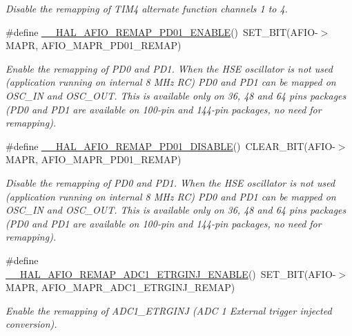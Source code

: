 \begin{DoxyCompactItemize}
\begin{DoxyCompactList}\small\item\em Disable the remapping of T\+I\+M4 alternate function channels 1 to 4. \end{DoxyCompactList}\item 
\#define \hyperlink{group___g_p_i_o_ex___a_f_i_o___a_f___r_e_m_a_p_p_i_n_g_ga556c166ea45a713875b6a179b101fa14}{\+\_\+\+\_\+\+H\+A\+L\+\_\+\+A\+F\+I\+O\+\_\+\+R\+E\+M\+A\+P\+\_\+\+P\+D01\+\_\+\+E\+N\+A\+B\+LE}()~S\+E\+T\+\_\+\+B\+IT(A\+F\+IO-\/$>$M\+A\+PR, A\+F\+I\+O\+\_\+\+M\+A\+P\+R\+\_\+\+P\+D01\+\_\+\+R\+E\+M\+AP)
\begin{DoxyCompactList}\small\item\em Enable the remapping of P\+D0 and P\+D1. When the H\+SE oscillator is not used (application running on internal 8 M\+Hz RC) P\+D0 and P\+D1 can be mapped on O\+S\+C\+\_\+\+IN and O\+S\+C\+\_\+\+O\+UT. This is available only on 36, 48 and 64 pins packages (P\+D0 and P\+D1 are available on 100-\/pin and 144-\/pin packages, no need for remapping). \end{DoxyCompactList}\item 
\#define \hyperlink{group___g_p_i_o_ex___a_f_i_o___a_f___r_e_m_a_p_p_i_n_g_gab56e83c0681be2899477e8d9376100ab}{\+\_\+\+\_\+\+H\+A\+L\+\_\+\+A\+F\+I\+O\+\_\+\+R\+E\+M\+A\+P\+\_\+\+P\+D01\+\_\+\+D\+I\+S\+A\+B\+LE}()~C\+L\+E\+A\+R\+\_\+\+B\+IT(A\+F\+IO-\/$>$M\+A\+PR, A\+F\+I\+O\+\_\+\+M\+A\+P\+R\+\_\+\+P\+D01\+\_\+\+R\+E\+M\+AP)
\begin{DoxyCompactList}\small\item\em Disable the remapping of P\+D0 and P\+D1. When the H\+SE oscillator is not used (application running on internal 8 M\+Hz RC) P\+D0 and P\+D1 can be mapped on O\+S\+C\+\_\+\+IN and O\+S\+C\+\_\+\+O\+UT. This is available only on 36, 48 and 64 pins packages (P\+D0 and P\+D1 are available on 100-\/pin and 144-\/pin packages, no need for remapping). \end{DoxyCompactList}\item 
\#define \hyperlink{group___g_p_i_o_ex___a_f_i_o___a_f___r_e_m_a_p_p_i_n_g_gae6a3cd6210ca82af1b21a56b46e40835}{\+\_\+\+\_\+\+H\+A\+L\+\_\+\+A\+F\+I\+O\+\_\+\+R\+E\+M\+A\+P\+\_\+\+A\+D\+C1\+\_\+\+E\+T\+R\+G\+I\+N\+J\+\_\+\+E\+N\+A\+B\+LE}()~S\+E\+T\+\_\+\+B\+IT(A\+F\+IO-\/$>$M\+A\+PR, A\+F\+I\+O\+\_\+\+M\+A\+P\+R\+\_\+\+A\+D\+C1\+\_\+\+E\+T\+R\+G\+I\+N\+J\+\_\+\+R\+E\+M\+AP)
\begin{DoxyCompactList}\small\item\em Enable the remapping of A\+D\+C1\+\_\+\+E\+T\+R\+G\+I\+NJ (A\+DC 1 External trigger injected conversion). \end{DoxyCompactList}\item 

\end{DoxyCompactItemize}
